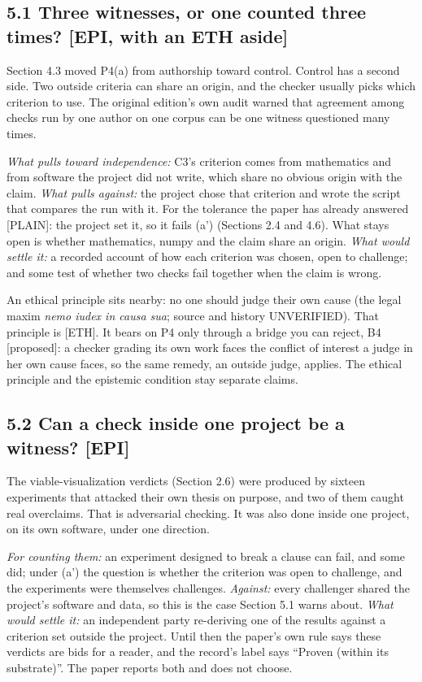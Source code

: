 \documentclass[11pt]{article}
\newcommand{\register}[1]{{\ttfamily\small #1}}
\begin{document}
\subsection*{5.1 Three witnesses, or one counted three times? [EPI, with an ETH aside]}

Section 4.3 moved P4(a) from authorship toward control. Control has a second side. Two outside criteria can share an origin, and the checker usually picks which criterion to use. The original edition's own audit warned that agreement among checks run by one author on one corpus can be one witness questioned many times.

\emph{What pulls toward independence:} C3's criterion comes from mathematics and from software the project did not write, which share no obvious origin with the claim. \emph{What pulls against:} the project chose that criterion and wrote the script that compares the run with it. For the tolerance the paper has already answered \register{[PLAIN]}: the project set it, so it fails (a') (Sections 2.4 and 4.6). What stays open is whether mathematics, numpy and the claim share an origin. \emph{What would settle it:} a recorded account of how each criterion was chosen, open to challenge; and some test of whether two checks fail together when the claim is wrong.

An ethical principle sits nearby: no one should judge their own cause (the legal maxim \emph{nemo iudex in causa sua}; source and history UNVERIFIED). That principle is [ETH]. It bears on P4 only through a bridge you can reject, B4 [proposed]: a checker grading its own work faces the conflict of interest a judge in her own cause faces, so the same remedy, an outside judge, applies. The ethical principle and the epistemic condition stay separate claims.

\subsection*{5.2 Can a check inside one project be a witness? [EPI]}

The viable-visualization verdicts (Section 2.6) were produced by sixteen experiments that attacked their own thesis on purpose, and two of them caught real overclaims. That is adversarial checking. It was also done inside one project, on its own software, under one direction.

\emph{For counting them:} an experiment designed to break a clause can fail, and some did; under (a') the question is whether the criterion was open to challenge, and the experiments were themselves challenges. \emph{Against:} every challenger shared the project's software and data, so this is the case Section 5.1 warns about. \emph{What would settle it:} an independent party re-deriving one of the results against a criterion set outside the project. Until then the paper's own rule says these verdicts are bids for a reader, and the record's label says ``Proven (within its substrate)''. The paper reports both and does not choose.
\end{document}
